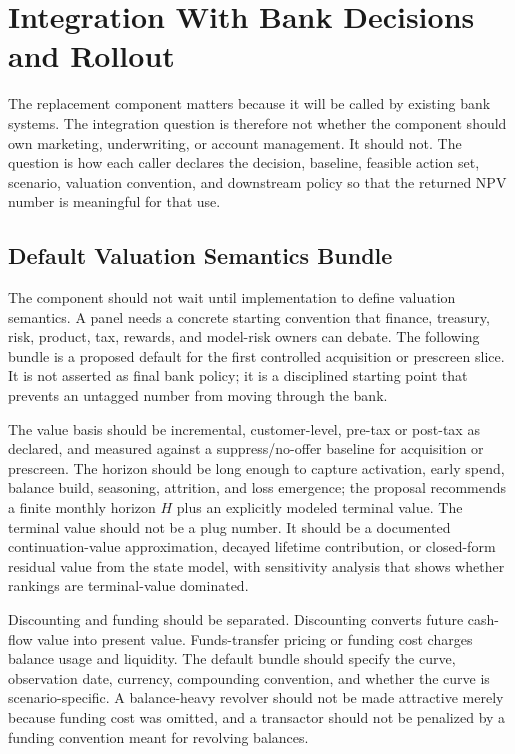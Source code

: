 \documentclass[11pt]{article}
\newcommand{\1}{\mathbf{1}}
\begin{document}
\section{Integration With Bank Decisions and Rollout}
\label{sec:v2-integration-rollout}

The replacement component matters because it will be called by existing bank
systems.  The integration question is therefore not whether the component should
own marketing, underwriting, or account management.  It should not.  The
question is how each caller declares the decision, baseline, feasible action set,
scenario, valuation convention, and downstream policy so that the returned NPV
number is meaningful for that use.

\subsection{Default Valuation Semantics Bundle}
\label{sec:valuation-semantics-default}

The component should not wait until implementation to define valuation
semantics. A panel needs a concrete starting convention that finance, treasury,
risk, product, tax, rewards, and model-risk owners can debate. The following
bundle is a proposed default for the first controlled acquisition or prescreen
slice. It is not asserted as final bank policy; it is a disciplined starting
point that prevents an untagged number from moving through the bank.

The value basis should be incremental, customer-level, pre-tax or post-tax as
declared, and measured against a suppress/no-offer baseline for acquisition or
prescreen. The horizon should be long enough to capture activation, early
spend, balance build, seasoning, attrition, and loss emergence; the proposal
recommends a finite monthly horizon $H$ plus an explicitly modeled terminal
value. The terminal value should not be a plug number. It should be a
documented continuation-value approximation, decayed lifetime contribution, or
closed-form residual value from the state model, with sensitivity analysis that
shows whether rankings are terminal-value dominated.

Discounting and funding should be separated. Discounting converts future
cash-flow value into present value. Funds-transfer pricing or funding cost
charges balance usage and liquidity. The default bundle should specify the
curve, observation date, currency, compounding convention, and whether the
curve is scenario-specific. A balance-heavy revolver should not be made
attractive merely because funding cost was omitted, and a transactor should
not be penalized by a funding convention meant for revolving balances.
\end{document}
